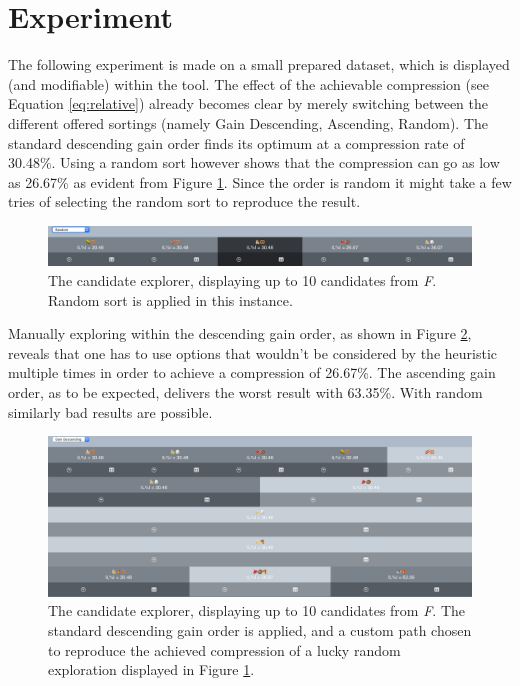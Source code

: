 \documentclass[runningheads]{llncs}
\begin{document}
\section{Experiment}
\label{sec:experiment}
The following experiment is made on a small prepared dataset, which is displayed (and modifiable) within the tool.
The effect of the achievable compression (see Equation \ref{eq:relative}) already becomes clear by merely switching between the different offered sortings (namely Gain Descending, Ascending, Random).
The standard descending gain order finds its optimum at a compression rate of 30.48\%. Using a random sort however shows that the compression can go as low as 26.67\% as evident from Figure \ref{fig:random}. Since the order is random it might take a few tries of selecting the random sort to reproduce the result.
\begin{figure}[H]
\center
\includegraphics[width=1\linewidth]{img/random_better.png}
\caption{The candidate explorer, displaying up to 10 candidates from \emph{F}. Random sort is applied in this instance.}
\label{fig:random}
\end{figure}

Manually exploring within the descending gain order, as shown in Figure \ref{fig:customWalk}, reveals that one has to use options that wouldn't be considered by the heuristic multiple times in order to achieve a compression of 26.67\%.
The ascending gain order, as to be expected, delivers the worst result with 63.35\%. With random similarly bad results are possible.

\begin{figure}[H]
\center
\includegraphics[width=1\linewidth]{img/custom_walk.png}
\caption{The candidate explorer, displaying up to 10 candidates from \emph{F}. The standard descending gain order is applied, and a custom path chosen to reproduce the achieved compression of a lucky random exploration displayed in Figure \ref{fig:random}.}
\label{fig:customWalk}
\end{figure}
\end{document}
